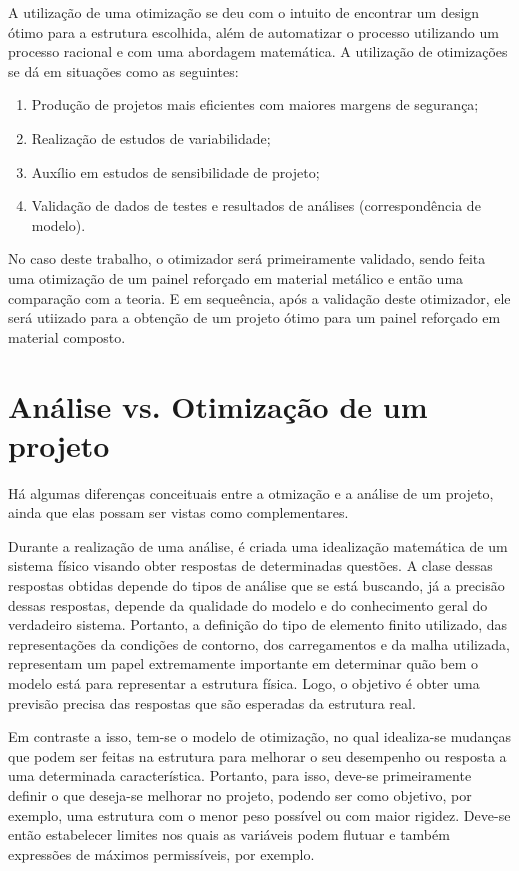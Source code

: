A utilização de uma otimização se deu com o intuito de encontrar um design ótimo para a estrutura escolhida, além de automatizar o processo utilizando um processo racional e com uma abordagem matemática. A utilização de otimizações se dá em situações como as seguintes:
\begin{enumerate}
  \item Produção de projetos mais eficientes com maiores margens de segurança;
  \item Realização de estudos de variabilidade;
  \item Auxílio em estudos de sensibilidade de projeto;
  \item Validação de dados de testes e resultados de análises (correspondência de modelo).
\end {enumerate}
No caso deste trabalho, o otimizador será primeiramente validado, sendo feita uma otimização de um painel reforçado em material metálico e então uma comparação com a teoria. E em sequeência, após a validação deste otimizador, ele será utiizado para a obtenção de um projeto ótimo para um painel reforçado em material composto.

\section{Análise vs. Otimização de um projeto}
Há algumas diferenças conceituais entre a otmização e a análise de um projeto, ainda que elas possam ser vistas como complementares.

 Durante a realização de uma análise, é criada uma idealização matemática de um sistema físico visando obter respostas de determinadas questões. A clase dessas respostas obtidas depende do tipos de análise que se está buscando, já a precisão dessas respostas, depende da qualidade do modelo e do conhecimento geral do verdadeiro sistema. Portanto, a definição do tipo de elemento finito utilizado, das representações da condições de contorno, dos carregamentos e da malha utilizada, representam um papel extremamente importante em determinar quão bem o modelo está para representar a estrutura física. Logo, o objetivo é obter uma previsão precisa das respostas que são esperadas da estrutura real.

 Em contraste a isso, tem-se o modelo de otimização, no qual idealiza-se mudanças que podem ser feitas na estrutura para melhorar o seu desempenho ou resposta a uma determinada característica. Portanto, para isso, deve-se primeiramente definir o que deseja-se melhorar no projeto, podendo ser como objetivo, por exemplo, uma estrutura com o menor peso possível ou com maior rigidez. Deve-se então estabelecer limites nos quais as variáveis podem flutuar e também expressões de máximos permissíveis, por exemplo.

